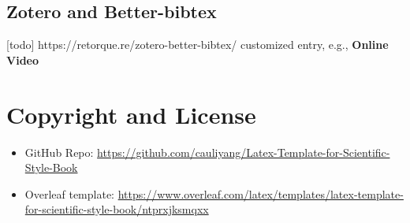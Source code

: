 \subsection{Zotero and Better-bibtex}
[todo]
https://retorque.re/zotero-better-bibtex/
customized entry, e.g., \textbf{Online Video}

\section{Copyright and License}

\begin{itemize}
	\item GitHub Repo: \url{https://github.com/cauliyang/Latex-Template-for-Scientific-Style-Book}
	\item Overleaf template: \url{https://www.overleaf.com/latex/templates/latex-template-for-scientific-style-book/ntprxjksmqxx}
\end{itemize}


